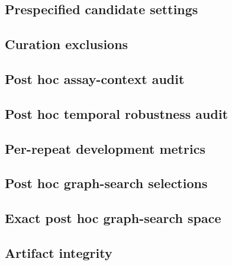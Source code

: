 \documentclass[11pt]{article}
\begin{document}
\subsection{Prespecified candidate settings}


\subsection{Curation exclusions}


\subsection{Post hoc assay-context audit}


\subsection{Post hoc temporal robustness audit}


\subsection{Per-repeat development metrics}


\subsection{Post hoc graph-search selections}


\subsection{Exact post hoc graph-search space}


\subsection{Artifact integrity}




\end{document}
